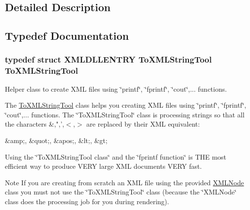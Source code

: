 \subsection{Detailed Description}


\subsection{Typedef Documentation}
\hypertarget{group__ToXMLStringTool_ga0460d731addf12b0863d4fd857ca8281}{
\subsubsection[{To\-X\-M\-L\-String\-Tool}]{\setlength{\rightskip}{0pt plus 5cm}typedef struct {\bf X\-M\-L\-D\-L\-L\-E\-N\-T\-R\-Y} {\bf To\-X\-M\-L\-String\-Tool}  {\bf To\-X\-M\-L\-String\-Tool}}}\label{group__ToXMLStringTool_ga0460d731addf12b0863d4fd857ca8281}


Helper class to create X\-M\-L files using \char`\"{}printf\char`\"{}, \char`\"{}fprintf\char`\"{}, \char`\"{}cout\char`\"{},... functions. 

The \hyperlink{structToXMLStringTool}{To\-X\-M\-L\-String\-Tool} class helps you creating X\-M\-L files using \char`\"{}printf\char`\"{}, \char`\"{}fprintf\char`\"{}, \char`\"{}cout\char`\"{},... functions. The \char`\"{}\-To\-X\-M\-L\-String\-Tool\char`\"{} class is processing strings so that all the characters \&,",',$<$,$>$ are replaced by their X\-M\-L equivalent\-: \begin{DoxyVerb}&amp;, &quot;, &apos;, &lt;, &gt; \end{DoxyVerb}
 Using the \char`\"{}\-To\-X\-M\-L\-String\-Tool class\char`\"{} and the \char`\"{}fprintf function\char`\"{} is T\-H\-E most efficient way to produce V\-E\-R\-Y large X\-M\-L documents V\-E\-R\-Y fast. \begin{DoxyNote}{Note}
If you are creating from scratch an X\-M\-L file using the provided \hyperlink{structXMLNode}{X\-M\-L\-Node} class you must not use the \char`\"{}\-To\-X\-M\-L\-String\-Tool\char`\"{} class (because the \char`\"{}\-X\-M\-L\-Node\char`\"{} class does the processing job for you during rendering). 
\end{DoxyNote}
